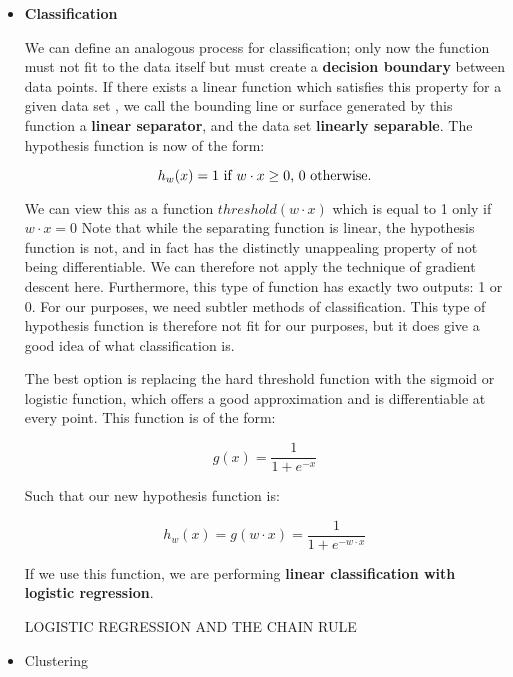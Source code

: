 \begin{itemize}
\item { 
    \textbf{Classification} 

    We can define an analogous process for classification; only now
    the function must not fit to the data itself but must create a
    \textbf{decision boundary} between data points. If there exists a
    linear function which satisfies this property for a given data set
    , we call the bounding line or surface generated by this function a
    \textbf{linear separator}, and the data set \textbf{linearly
      separable}. The hypothesis function is now of the form:
    
    \begin{equation}
      h_w(x) = 1$ if $ w \cdot x \geq 0$, $0$ otherwise.$
    \end{equation}

    We can view this as a function $threshold(w \cdot x)$ which is
    equal to 1 only if $w \cdot x = 0$ Note that while the separating
    function is linear, the hypothesis function is not, and in fact has
    the distinctly unappealing property of not being differentiable. We
    can therefore not apply the technique of gradient descent
    here. Furthermore, this type of function has exactly two outputs: 1 or
    0. For our purposes, we need subtler methods of classification.  This
    type of hypothesis function is therefore not fit for our purposes, but
    it does give a good idea of what classification is.

    The best option is replacing the hard threshold function with the
    sigmoid or logistic function, which offers a good approximation and is
    differentiable at every point. This function is of the form:


    \begin{equation}
      g(x) = \frac{1}{1 + e^{-x}}
    \end{equation}

    Such that our new hypothesis function is:

    \begin{equation}
      h_w(x) = g(w \cdot x) = \frac{1}{1 + e^{- w \cdot x}}
    \end{equation}

    If we use this function, we are performing \textbf{linear
      classification with logistic regression}.

    LOGISTIC REGRESSION AND THE CHAIN RULE
  }

  \item Clustering
\end{itemize}



